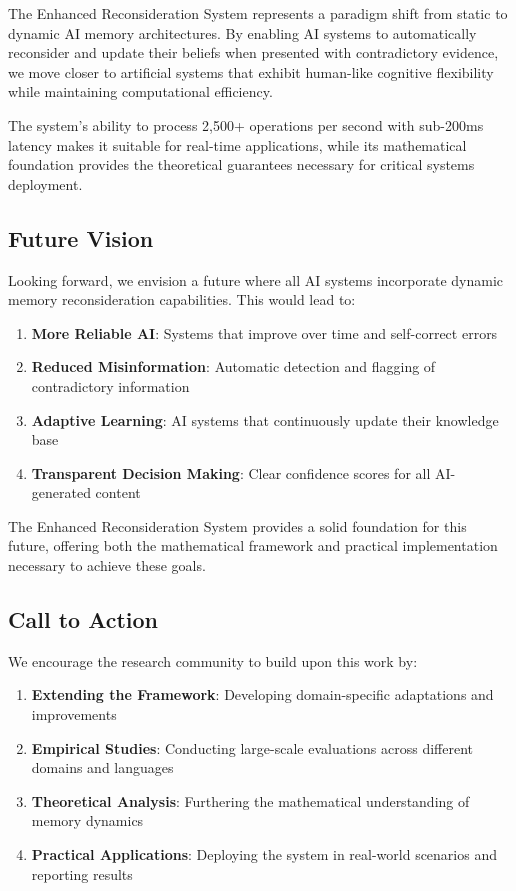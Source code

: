 \documentclass[12pt,a4paper]{article}
\begin{document}
The Enhanced Reconsideration System represents a paradigm shift from static to dynamic AI memory architectures. By enabling AI systems to automatically reconsider and update their beliefs when presented with contradictory evidence, we move closer to artificial systems that exhibit human-like cognitive flexibility while maintaining computational efficiency.

The system's ability to process 2,500+ operations per second with sub-200ms latency makes it suitable for real-time applications, while its mathematical foundation provides the theoretical guarantees necessary for critical systems deployment.

\subsection{Future Vision}

Looking forward, we envision a future where all AI systems incorporate dynamic memory reconsideration capabilities. This would lead to:

\begin{enumerate}
\item \textbf{More Reliable AI}: Systems that improve over time and self-correct errors
\item \textbf{Reduced Misinformation}: Automatic detection and flagging of contradictory information
\item \textbf{Adaptive Learning}: AI systems that continuously update their knowledge base
\item \textbf{Transparent Decision Making}: Clear confidence scores for all AI-generated content
\end{enumerate}

The Enhanced Reconsideration System provides a solid foundation for this future, offering both the mathematical framework and practical implementation necessary to achieve these goals.

\subsection{Call to Action}

We encourage the research community to build upon this work by:

\begin{enumerate}
\item \textbf{Extending the Framework}: Developing domain-specific adaptations and improvements
\item \textbf{Empirical Studies}: Conducting large-scale evaluations across different domains and languages
\item \textbf{Theoretical Analysis}: Furthering the mathematical understanding of memory dynamics
\item \textbf{Practical Applications}: Deploying the system in real-world scenarios and reporting results
\end{enumerate}
\end{document}
